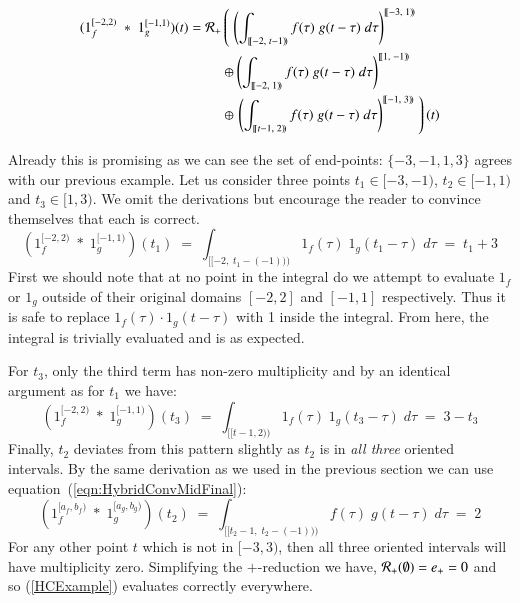 \begin{align}
	\label{HCExample}
	(1_f^{[-2,2)} \;*\; 1_g^{[-1,1)}) (t) = 
		\R[+] &\left( \; \left( 
			\int_{[\![-2,\;t-1)\!)} f(\tau) \; g(t-\tau) \; d\tau \right)^{[\![-3,\; 1)\!)} 
				\right. \notag \\ &\oplus \left( 
			\int_{[\![-2,\;1)\!)} f(\tau) \; g(t-\tau) \; d\tau \right)^{[\![1,\; -1)\!)} 
				\notag \\ &\oplus \left. \left( 
			\int_{[\![t-1,\;2)\!)} f(\tau) \; g(t-\tau) \; d\tau \right)^{[\![-1,\; 3)\!)} 
				\; \right)(t)
\end{align}


Already this is promising as we can see the set of end-points: $\{-3, -1, 1, 3\}$ agrees with our previous example.
Let us consider three points $t_1 \in [-3, -1)$, $t_2 \in [-1, 1)$ and $t_3 \in [1,3)$.
We omit the derivations but encourage the reader to convince themselves that each is correct.
\begin{equation*}
	(1_f^{[-2,2)} \;*\; 1_g^{[-1,1)}) (t_1) 
		\;=\; \int_{[\![-2,\;t_1-(-1))\!)} 1_f(\tau) \; 1_g(t_1-\tau) \; d\tau
		\;=\; t_1 + 3
\end{equation*}
First we should note that at no point in the integral do we attempt to evaluate $1_f$ or $1_g$ outside of their original 
domains $[-2,2]$ and $[-1,1]$ respectively. 
Thus it is safe to replace $1_f(\tau)\cdot 1_g(t-\tau)$ with 1  inside the integral.
From here, the integral is trivially evaluated and is as expected.


For $t_3$, only the third term has non-zero multiplicity and by an identical argument as for $t_1$ we have:
\begin{equation*}
	(1_f^{[-2,2)} \;*\; 1_g^{[-1,1)}) (t_3) 
		\;=\; \int_{[\![t-1,2)\!)} 1_f(\tau) \; 1_g(t_3-\tau) \; d\tau
		\;=\; 3 - t_3
\end{equation*}
Finally, $t_2$ deviates from this pattern slightly as $t_2$ is in \emph{all three} oriented intervals.
By the same derivation as we used in the previous section we can use equation~(\ref{eqn:HybridConvMidFinal}):
\begin{equation*}
	\label{eqn:HCExampleT2}
	(1_f^{[a_f,b_f)} \;*\; 1_g^{[a_g,b_g)}) (t_2) 
		\;=\; \int_{[\![t_2-1,\;t_2-(-1))\!)} f(\tau) \; g(t-\tau) \; d\tau
		\;=\; 2
\end{equation*}
For any other point $t$ which is not in $[-3, 3)$, then all three oriented intervals will have multiplicity zero.
Simplifying the $+$-reduction we have, $\R[+](\emptyset) = e_+ = 0$ and so (\ref{HCExample}) evaluates correctly 
everywhere.





